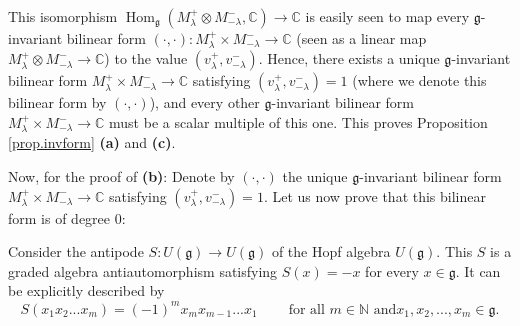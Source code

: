 \documentclass
[numbers=enddot,12pt,final,onecolumn,german,notitlepage]{scrartcl}%
\theoremstyle{definition}
\begin{document}
This isomorphism $\operatorname*{Hom}\nolimits_{\mathfrak{g}}\left(
M_{\lambda}^{+}\otimes M_{-\lambda}^{-},\mathbb{C}\right)  \rightarrow
\mathbb{C}$ is easily seen to map every $\mathfrak{g}$-invariant bilinear form
$\left(  \cdot,\cdot\right)  :M_{\lambda}^{+}\times M_{-\lambda}%
^{-}\rightarrow\mathbb{C}$ (seen as a linear map $M_{\lambda}^{+}\otimes
M_{-\lambda}^{-}\rightarrow\mathbb{C}$) to the value $\left(  v_{\lambda}%
^{+},v_{-\lambda}^{-}\right)  $. Hence, there exists a unique $\mathfrak{g}%
$-invariant bilinear form $M_{\lambda}^{+}\times M_{-\lambda}^{-}%
\rightarrow\mathbb{C}$ satisfying $\left(  v_{\lambda}^{+},v_{-\lambda}%
^{-}\right)  =1$ (where we denote this bilinear form by $\left(  \cdot
,\cdot\right)  $), and every other $\mathfrak{g}$-invariant bilinear form
$M_{\lambda}^{+}\times M_{-\lambda}^{-}\rightarrow\mathbb{C}$ must be a scalar
multiple of this one. This proves Proposition \ref{prop.invform} \textbf{(a)}
and \textbf{(c)}.

Now, for the proof of \textbf{(b)}: Denote by $\left(  \cdot,\cdot\right)  $
the unique $\mathfrak{g}$-invariant bilinear form $M_{\lambda}^{+}\times
M_{-\lambda}^{-}\rightarrow\mathbb{C}$ satisfying $\left(  v_{\lambda}%
^{+},v_{-\lambda}^{-}\right)  =1$. Let us now prove that this bilinear form is
of degree $0$:

Consider the antipode $S:U\left(  \mathfrak{g}\right)  \rightarrow U\left(
\mathfrak{g}\right)  $ of the Hopf algebra $U\left(  \mathfrak{g}\right)  $.
This $S$ is a graded algebra antiautomorphism satisfying $S\left(  x\right)
=-x$ for every $x\in\mathfrak{g}$. It can be explicitly described by
\[
S\left(  x_{1}x_{2}...x_{m}\right)  =\left(  -1\right)  ^{m}x_{m}%
x_{m-1}...x_{1}\ \ \ \ \ \ \ \ \ \ \text{for all }m\in\mathbb{N}\text{ and
}x_{1},x_{2},...,x_{m}\in\mathfrak{g}.
\]
\end{document}
